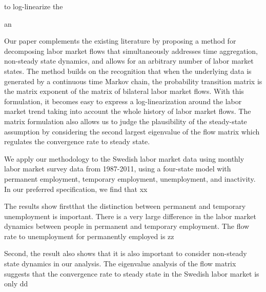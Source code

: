 
to log-linearize the

an

Our paper complements the existing literature by proposing a method for decomposing labor market flows that simultaneously addresses time aggregation, non-steady state dynamics, and allows for an arbitrary number of labor market states. The method builds on the recognition that when the underlying data is generated by a continuous time Markov chain, the probability transition matrix is the matrix exponent of the matrix of bilateral labor market flows. With this formulation, it becomes easy to express a log-linearization around the labor market trend taking into account the whole history of labor market flows. The matrix formulation also allows us to judge the plausibility of the steady-state assumption by considering the second largest eigenvalue of the flow matrix which regulates the convergence rate to steady state.

We apply our methodology to the Swedish labor market data using monthly labor market survey data from 1987-2011, using a four-state model with permanent employment, temporary employment, unemployment, and inactivity. In our preferred specification, we find that xx%

The results show firstthat the distinction between permanent and temporary unemployment is important. There is a very large difference in the labor market dynamics between people in permanent and temporary employment. The flow rate to unemployment for permanently employed is zz%

Second, the result also shows that it is also important to consider non-steady state dynamics in our analysis. The eigenvalue analysis of the flow matrix suggests that the convergence rate to steady state in the Swedish labor market is only dd%
